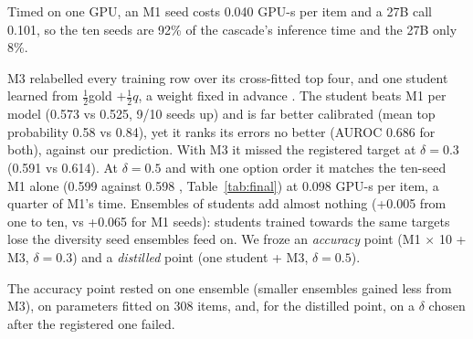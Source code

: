 Timed on one GPU, an M1 seed costs 0.040 GPU-s per item and a 27B call 0.101, so the ten seeds are 92\% of the cascade's inference time and the 27B only 8\%.

M3 relabelled every training row over its cross-fitted top four, and one student learned from $\tfrac12$gold $+ \tfrac12 q$, a weight fixed in advance \citep{hinton2015distilling}.
The student beats M1 per model (0.573 vs 0.525, 9/10 seeds up) and is far better calibrated (mean top probability 0.58 vs 0.84), yet it ranks its errors no better (AUROC 0.686 for both), against our prediction.
With M3 it missed the registered target at $\delta = 0.3$ (0.591 vs 0.614). At $\delta = 0.5$ and with one option order it matches the ten-seed M1 alone (0.599 against 0.598 \Stwo{}, Table~\ref{tab:final}) at 0.098 GPU-s per item, a quarter of M1's time.
Ensembles of students add almost nothing (+0.005 from one to ten, vs +0.065 for M1 seeds): students trained towards the same targets lose the diversity seed ensembles feed on.
We froze an \emph{accuracy} point (M1 $\times$ 10 + M3, $\delta = 0.3$) and a \emph{distilled} point (one student + M3, $\delta = 0.5$).

The accuracy point rested on one ensemble (smaller ensembles gained less from M3), on parameters fitted on 308 items, and, for the distilled point, on a $\delta$ chosen after the registered one failed.
